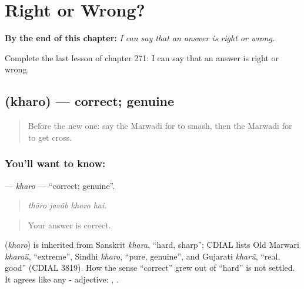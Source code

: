 
\chapter{Right or Wrong?}
\label{ch:mw-right-or-wrong}

\begin{chapteropening}
\textbf{By the end of this chapter:} \emph{I can say that an answer is right or wrong.}

Complete the last lesson of chapter 271: I can say that an answer is right or wrong.
\end{chapteropening}

\section[\texorpdfstring{\mw{खरो} (kharo)}{खरो (kharo)}]{ (kharo) — correct; genuine}

\label{lesson:MW-C271-kharo}



\begin{quote}
Before the new one: say the Marwadi for to smash, then the Marwadi for to get cross.
\end{quote}

\subsection*{You'll want to know: }
\textbf{} — \emph{kharo} — \textquotedblleft{}correct; genuine\textquotedblright{}.

\begin{quote}
   
\end{quote}

\begin{quote}
\emph{thāro javāb kharo hai.}
\end{quote}

\begin{quote}
Your answer is correct.
\end{quote}

\begin{cousinweb}
\textbf{} (\emph{kharo}) is inherited from Sanskrit \emph{khara}, \textquotedblleft{}hard, sharp\textquotedblright{}; CDIAL lists Old Marwari \emph{kharaü}, \textquotedblleft{}extreme\textquotedblright{}, Sindhi \emph{kharo}, \textquotedblleft{}pure, genuine\textquotedblright{}, and Gujarati \emph{kharũ}, \textquotedblleft{}real, good\textquotedblright{} (CDIAL 3819). How the sense \textquotedblleft{}correct\textquotedblright{} grew out of \textquotedblleft{}hard\textquotedblright{} is not settled. It agrees like any - adjective: \textbf{ }, \textbf{ }.
\end{cousinweb}

